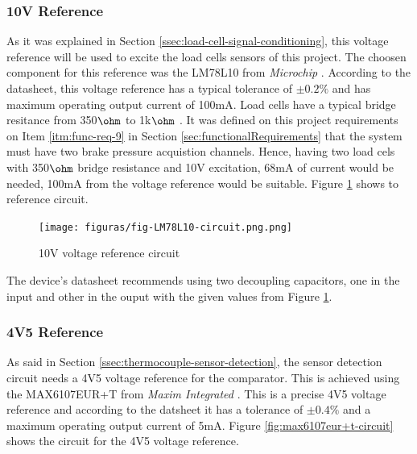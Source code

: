 		\subsubsection{10V Reference}\label{sssec:10v-reference}
			As it was explained in Section \ref{ssec:load-cell-signal-conditioning}, this voltage reference will be used to excite the load cells sensors of this project. The choosen component for this reference was the LM78L10 from \textit{Microchip} \cite{LM78L10-datasheet}. According to the datasheet, this voltage reference has a typical tolerance of $\pm 0.2\%$ and has maximum operating output current of 100mA. Load cells have a typical bridge resitance from 350$\ohm$ to 1k$\ohm$ \cite{GMIloadcell}. It was defined on this project requirements on Item \ref{itm:func-req-9} in Section \ref{sec:functionalRequirements} that the system must have two brake pressure acquistion channels. Hence, having two load cels with 350$\ohm$ bridge resistance and 10V excitation, 68mA of current would be needed, 100mA from the voltage reference would be suitable. Figure \ref{fig:LM78L10-circuit} shows to reference circuit.

			\begin{figure}[htbp]
				\centering
					\texttt{[image: figuras/fig-LM78L10-circuit.png.png]}
				\caption{10V voltage reference circuit \cite{LM78L10-circuit}}
				\label{fig:LM78L10-circuit}
			\end{figure}

			The device's datasheet recommends using two decoupling capacitors, one in the input and other in the ouput with the given values from Figure \ref{fig:LM78L10-circuit}.

		\subsubsection{4V5 Reference}\label{sssec:4v5-reference}

			As said in Section \ref{ssec:thermocouple-sensor-detection}, the sensor detection circuit needs a 4V5 voltage reference for the comparator. This is achieved using the MAX6107EUR+T from \textit{Maxim Integrated} \cite{max6107eur+t-datasheet}. This is a precise 4V5 voltage reference and according to the datsheet it has a tolerance of $\pm0.4\%$ and a maximum operating output current of 5mA. Figure \ref{fig:max6107eur+t-circuit} shows the circuit for the 4V5 voltage reference.

